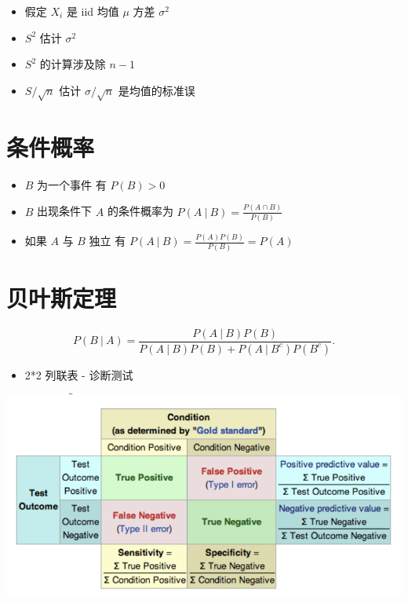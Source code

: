 \documentclass[]{book}
\providecommand{\tightlist}{%
  \setlength{\itemsep}{0pt}\setlength{\parskip}{0pt}}
\begin{document}
\begin{itemize}
  \begin{itemize}
  \tightlist
  \item
    假定 \(X_i\) 是 iid 均值 \(\mu\) 方差 \(\sigma^2\)
  \item
    \(S^2\) 估计 \(\sigma^2\)
  \item
    \(S^2\) 的计算涉及除 \(n-1\)
  \item
    \(S / \sqrt{n}\) 估计 \(\sigma / \sqrt{n}\) 是均值的标准误
  \end{itemize}
\end{itemize}

\section{条件概率}

\begin{itemize}
\tightlist
\item
  \(B\) 为一个事件 有 \(P(B) > 0\)
\item
  \(B\) 出现条件下 \(A\) 的条件概率为 \(P(A ~|~ B) = \frac{P(A \cap B)}{P(B)}\)
\item
  如果 \(A\) 与 \(B\) 独立 有 \(P(A ~|~ B) = \frac{P(A) P(B)}{P(B)} = P(A)\)
\end{itemize}

\section{贝叶斯定理}

\[
P(B ~|~ A) = \frac{P(A ~|~ B) P(B)}{P(A ~|~ B) P(B) + P(A ~|~ B^c)P(B^c)}.
\]

\begin{itemize}
\tightlist
\item
  2*2 列联表 - 诊断测试
\end{itemize}

\includegraphics[width=11.74in]{images/error}
\end{document}
